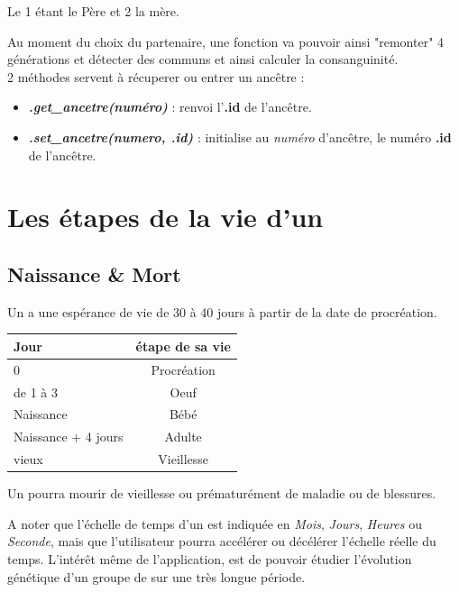 \documentclass[french]{report}
\newlength{\du}\fi
\begin{document}
\begin{center}
	Le 1 étant le Père et 2 la mère.\\
\end{center}
Au moment du choix du partenaire, une fonction va pouvoir ainsi "remonter" 4 générations et détecter des \CoCiX communs et ainsi calculer la consanguinité.\\

2 méthodes servent à récuperer ou entrer un ancêtre : 
\begin{itemize}
	\item \textbf{\textit{.get\_ancetre(numéro)}} : renvoi l'\textbf{.id} de l'ancêtre.
	\item \textit{\textbf{.set\_ancetre(numero, .id)}} : initialise au \textit{numéro} d'ancêtre, le numéro \textbf{.id} de l'ancêtre.
\end{itemize}
\section{Les étapes de la vie d'un \CoCiX}
\subsection{Naissance \& Mort}
Un \CoCiX a une espérance de vie de 30 à 40 jours à partir de la date de procréation.

\begin{center}
	\begin{tabular}{|l| c|} \hline
		\textbf{Jour} & \textbf{étape de sa vie}\\ \hline
		0 & Procréation\\
		de 1 à 3 & Oeuf\\
		Naissance & Bébé\\
		Naissance + 4 jours & Adulte\\ 
		vieux\footnotemark[1] & Vieillesse\\ \hline
	\end{tabular}
\end{center}
Un \CoCiX pourra mourir de vieillesse ou prématurément de maladie ou de blessures.

A noter que l'échelle de temps d'un \CoCiX est indiquée en \textit{Mois}, \textit{Jours}, \textit{Heures} ou \textit{Seconde}, mais que l'utilisateur pourra accélérer ou décélérer l'échelle réelle du temps. L'intérêt même de l'application, est de pouvoir étudier l'évolution génétique d'un groupe de \CoCiX sur une très longue période.

\end{document}
